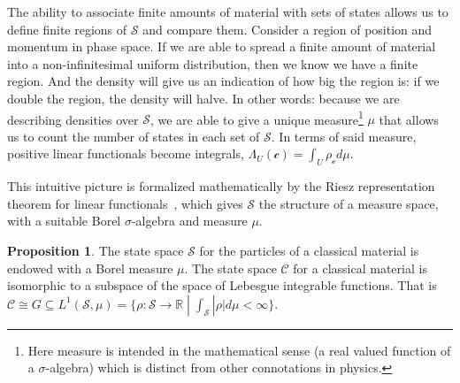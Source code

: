 \documentclass[smallextended]{svjour3}
\numberwithin{equation}{section}
\theoremstyle{definition}
\newtheorem{prop}[equation]{Proposition}
\begin{document}
The ability to associate finite amounts of material with sets of states allows us to define finite regions of $\mathcal{S}$ and compare them. Consider a region of position and momentum in phase space. If we are able to spread a finite amount of material into a non-infinitesimal uniform distribution, then we know we have a finite region. And the density will give us an indication of how big the region is: if we double the region, the density will halve. In other words: because we are describing densities over $\mathcal{S}$, we are able to give a unique measure\footnote{Here measure is intended in the mathematical sense (a real valued function of a $\sigma$-algebra) which is distinct from other connotations in physics.} $\mu$ that allows us to count the number of states in each set of $\mathcal{S}$. In terms of said measure, positive linear functionals become integrals, $\Lambda_U (\mathcal{c}) = \int_U \rho_{\mathcal{c}} d \mu$.

This intuitive picture is formalized mathematically by the Riesz representation theorem for linear functionals~\cite{Halmos}, which gives $\mathcal{S}$ the structure of a measure space, with a suitable Borel $\sigma$-algebra and measure $\mu$.

\begin{prop}\label{prop:integration}
	The state space $\mathcal{S}$ for the particles of a classical material is endowed with a Borel measure $\mu$. The state space $\mathcal{C}$ for a classical material is isomorphic to a subspace of the space of Lebesgue integrable functions. That is $\mathcal{C} \cong G \subseteq L^1(\mathcal{S}, \mu) = \{ \rho : \mathcal{S} \rightarrow \mathbb{R} \; | \; \int_{\mathcal{S}} |\rho| d\mu < \infty \}$.
\end{prop}
\end{document}
